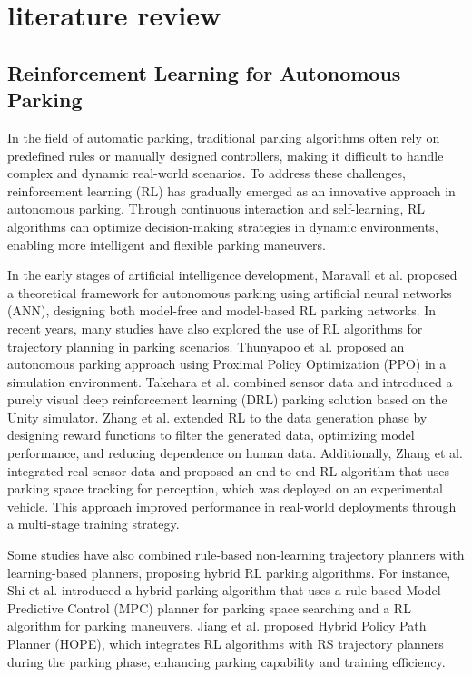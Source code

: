 \section{literature review}
\subsection{Reinforcement Learning for Autonomous  Parking}
In the field of automatic parking, traditional parking algorithms often rely on predefined rules or manually designed controllers, making it difficult to handle complex and dynamic real-world scenarios. 
To address these challenges, reinforcement learning (RL) has gradually emerged as an innovative approach in autonomous parking. 
Through continuous interaction and self-learning, RL algorithms can optimize decision-making strategies in dynamic environments, enabling more intelligent and flexible parking maneuvers.

In the early stages of artificial intelligence development, Maravall et al.\cite{maravall2003automatic} proposed a theoretical framework for autonomous parking using artificial neural networks (ANN), designing both model-free and model-based RL parking networks. 
In recent years, many studies have also explored the use of RL algorithms for trajectory planning in parking scenarios. 
Thunyapoo et al.\cite{thunyapoo2020self} proposed an autonomous parking approach using Proximal Policy Optimization (PPO) in a simulation environment. 
Takehara et al.\cite{takehara2021autonomous} combined sensor data and introduced a purely visual deep reinforcement learning (DRL) parking solution based on the Unity simulator. 
Zhang et al.\cite{zhang2020data} extended RL to the data generation phase by designing reward functions to filter the generated data, optimizing model performance, and reducing dependence on human data. Additionally, Zhang et al.\cite{zhang2019e2e} integrated real sensor data and proposed an end-to-end RL algorithm that uses parking space tracking for perception, which was deployed on an experimental vehicle. This approach improved performance in real-world deployments through a multi-stage training strategy.

Some studies have also combined rule-based non-learning trajectory planners with learning-based planners, proposing hybrid RL parking algorithms. 
For instance, Shi et al.\cite{shi2023model} introduced a hybrid parking algorithm that uses a rule-based Model Predictive Control (MPC) planner for parking space searching and a RL algorithm for parking maneuvers. 
Jiang et al. \cite{jiang2024hope} proposed Hybrid Policy Path Planner (HOPE), which integrates RL algorithms with RS trajectory planners during the parking phase, enhancing parking capability and training efficiency.

